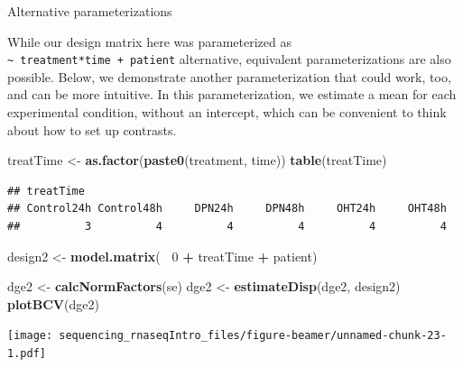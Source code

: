 \documentclass[ignorenonframetext,]{beamer}
\newenvironment{Shaded}{\begin{snugshade}}{\end{snugshade}}
\newcommand{\DecValTok}[1]{\textcolor[rgb]{0.00,0.00,0.81}{#1}}
\newcommand{\KeywordTok}[1]{\textcolor[rgb]{0.13,0.29,0.53}{\textbf{#1}}}
\newcommand{\NormalTok}[1]{#1}
\newcommand{\OperatorTok}[1]{\textcolor[rgb]{0.81,0.36,0.00}{\textbf{#1}}}
\newcommand{\StringTok}[1]{\textcolor[rgb]{0.31,0.60,0.02}{#1}}
\begin{document}
\begin{frame}[fragile]{Alternative parameterizations}
\protect\hypertarget{alternative-parameterizations}{}

While our design matrix here was parameterized as
\texttt{\textasciitilde{}\ treatment*time\ +\ patient} alternative,
equivalent parameterizations are also possible. Below, we demonstrate
another parameterization that could work, too, and can be more
intuitive. In this parameterization, we estimate a mean for each
experimental condition, without an intercept, which can be convenient to
think about how to set up contrasts.

\begin{Shaded}
\begin{Highlighting}[]
\NormalTok{treatTime <-}\StringTok{ }\KeywordTok{as.factor}\NormalTok{(}\KeywordTok{paste0}\NormalTok{(treatment, time))}
\KeywordTok{table}\NormalTok{(treatTime)}
\end{Highlighting}
\end{Shaded}

\begin{verbatim}
## treatTime
## Control24h Control48h     DPN24h     DPN48h     OHT24h     OHT48h 
##          3          4          4          4          4          4
\end{verbatim}

\begin{Shaded}
\begin{Highlighting}[]
\NormalTok{design2 <-}\StringTok{ }\KeywordTok{model.matrix}\NormalTok{(}\OperatorTok{~}\StringTok{ }\DecValTok{0} \OperatorTok{+}\StringTok{ }\NormalTok{treatTime }\OperatorTok{+}\StringTok{ }\NormalTok{patient)}

\NormalTok{dge2 <-}\StringTok{ }\KeywordTok{calcNormFactors}\NormalTok{(se)}
\NormalTok{dge2 <-}\StringTok{ }\KeywordTok{estimateDisp}\NormalTok{(dge2, design2)}
\KeywordTok{plotBCV}\NormalTok{(dge2)}
\end{Highlighting}
\end{Shaded}

\texttt{[image: sequencing\_rnaseqIntro\_files/figure-beamer/unnamed-chunk-23-1.pdf]}

\begin{Shaded}
\end{Shaded}


\end{frame}
\end{document}

